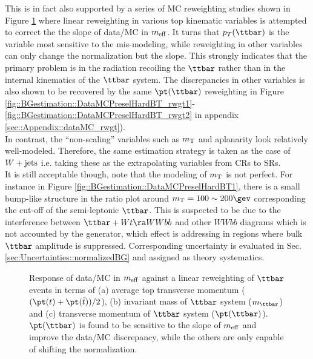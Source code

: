 This is in fact also supported by a series of MC reweighting studies shown in Figure \ref{fig::BGestimation::slope_rwgt}  where linear reweighting in various top kinematic variables is attempted to correct the the slope of data/MC in $m_{\mathrm{eff}}$. It turns that $p_{T}(\ttbar)$ is the variable most sensitive to the mis-modeling, while reweighting in other variables can only change the normalization but the slope. This strongly indicates that the primary problem is in the radiation recoiling the $\ttbar$ rather than in the internal kinematics of the $\ttbar$ system. 
The discrepancies in other variables is also shown to be recovered by the same $\ttPt$ reweighting in Figure \ref{fig::BGestimation::DataMCPreselHardBT_rwgt1}-\ref{fig::BGestimation::DataMCPreselHardBT_rwgt2} in appendix \ref{sec::Appendix::dataMC_rwgt}).
\\
In contrast, the ``non-scaling'' variables such as $m_{\mathrm{T}}$ and aplanarity look relatively well-modeled. Therefore, the same estimation strategy is taken as the case of $W+\mathrm{jets}$ i.e. taking these as the extrapolating variables from CRs to SRs. \\

It is still acceptable though, note that the modeling of $m_{\mathrm{T}}$ is not perfect. 
For instance in Figure \ref{fig::BGestimation::DataMCPreselHardBT1}, there is a small bump-like structure in the ratio plot around $\mt = 100\sim200\gev$ corresponding the cut-off of the semi-leptonic $\ttbar$. 
This is suspected to be due to the interference between $\ttbar+Wt\ra WWbb$ and other $WWbb$ diagrams which is not accounted by the generator, which effect is addressing in regions where bulk $\ttbar$ amplitude is suppressed. Corresponding uncertainty is evaluated in Sec. \ref{sec:Uncertainties::normalizedBG} and assigned as theory systematics. \\


\begin{figure}[h]
  \centering
    \caption{ Response of data/MC in $m_{\mathrm{eff}}$ against a linear reweighting of $\ttbar$ events in terms of
 (a) average top transverse momentum ($(\pt(t)+\pt(\bar{t}))/2$), 
 (b) invariant mass of $\ttbar$ system ($m_{\ttbar}$) and
 (c) transverse momentum of $\ttbar$ system ($\pt(\ttbar)$). 
$\pt(\ttbar)$ is found to be sensitive to the slope of $m_{\mathrm{eff}}$ and improve the data/MC discrepancy, while the others are only capable of shifting the normalization. 
\label{fig::BGestimation::slope_rwgt} }
\end{figure}


